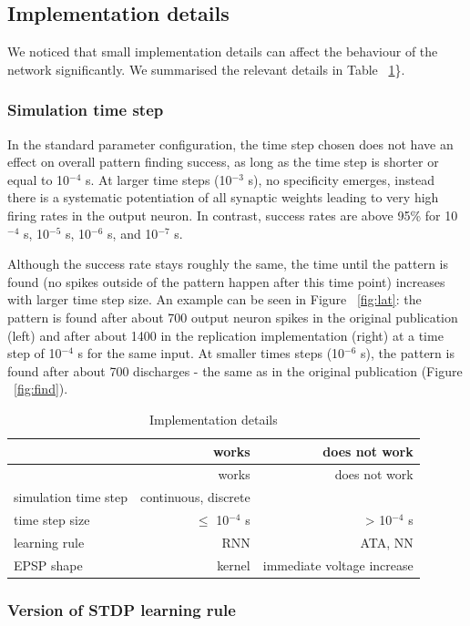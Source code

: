 \documentclass[10pt,a4paper,onecolumn]{article}
\begin{document}
\subsection{Implementation details}\label{implementation-details}

We noticed that small implementation details can affect the behaviour of
the network significantly. We summarised the relevant details in Table
~\ref{tbl:impl}\}.

\subsubsection{Simulation time step}\label{simulation-time-step}

In the standard parameter configuration, the time step chosen does not
have an effect on overall pattern finding success, as long as the time
step is shorter or equal to 10\(^{-4}\) s. At larger time steps
(10\(^{-3}\) s), no specificity emerges, instead there is a systematic
potentiation of all synaptic weights leading to very high firing rates
in the output neuron. In contrast, success rates are above 95\% for
10\(^{-4}\) s, 10\(^{-5}\) s, 10\(^{-6}\) s, and 10\(^{-7}\) s.

Although the success rate stays roughly the same, the time until the
pattern is found (no spikes outside of the pattern happen after this
time point) increases with larger time step size. An example can be seen
in Figure ~\ref{fig:lat}: the pattern is found after about 700 output
neuron spikes in the original publication (left) and after about 1400 in
the replication implementation (right) at a time step of 10\(^{-4}\) s
for the same input. At smaller times steps (10\(^{-6}\) s), the pattern
is found after about 700 discharges - the same as in the original
publication (Figure ~\ref{fig:find}).

\hypertarget{tbl:impl}{}
\begin{longtable}[]{@{}lrr@{}}
\caption{\label{tbl:impl}Implementation details}\tabularnewline
\toprule
& works & does not work\tabularnewline
\midrule
\endfirsthead
\toprule
& works & does not work\tabularnewline
\midrule
\endhead
simulation time step & continuous, discrete &\tabularnewline
time step size & \(\leq\) 10\(^{-4}\) s & \textgreater{} 10\(^{-4}\)
s\tabularnewline
learning rule & RNN & ATA, NN\tabularnewline
EPSP shape & kernel & immediate voltage increase\tabularnewline
\bottomrule
\end{longtable}

\subsubsection{Version of STDP learning
rule}\label{version-of-stdp-learning-rule}
\end{document}
